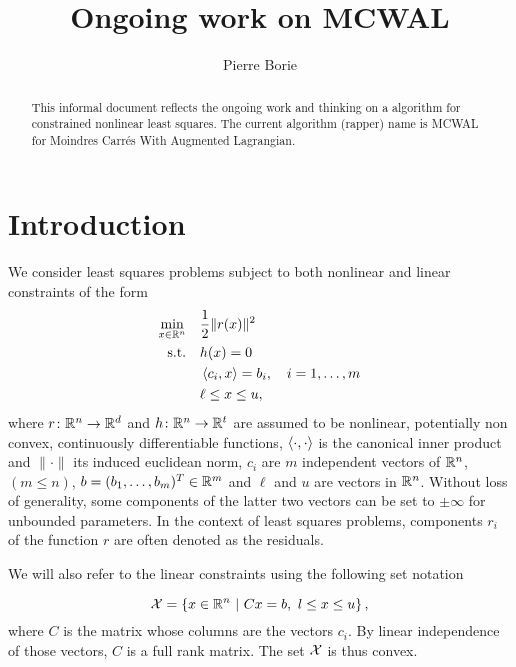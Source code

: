 \documentclass[10pt]{article}
\numberwithin{equation}{section}
\begin{document}
	
	
	\title{Ongoing work on MCWAL} %
	\author{Pierre Borie}
	
	
	
	\maketitle
	
	\begin{abstract}
		\noindent This informal document  reflects the ongoing work and thinking on a algorithm for constrained nonlinear least squares. The current algorithm (rapper) name is MCWAL for Moindres Carr\'es With Augmented Lagrangian.
	\end{abstract} %
	

	\section{Introduction}\label{sec:intro}
	
	We consider least squares problems subject to both nonlinear and linear constraints of the form
	\begin{equation}
		\label{eq:model_cnls}
		\begin{aligned}
			\min_{x\in {\mathbb{R}}^n} \quad & \dfrac{1}{2} \|r(x)\|^2 \\
			\text{s.t.} \quad & h(x) = 0 \\
			& \left\langle {c_i} , {x} \right\rangle = b_i,\quad i=1,\ldots,m \\
			& \ell \le x \le u,
		\end{aligned}
	\end{equation}
	where $r\colon {\mathbb{R}}^n \to {\mathbb{R}}^d$  and $h\colon {\mathbb{R}}^n \to {\mathbb{R}}^t$ are assumed to be nonlinear, potentially non convex, continuously differentiable functions, $\left\langle {\cdot} , {\cdot} \right\rangle$ is the canonical inner product and $\|\cdot\| $  its induced euclidean norm, $c_i$ are $m$  independent vectors of ${\mathbb{R}}^n$, $( m \le n)$, $b=(b_1,\ldots,b_m)^T \in {\mathbb{R}}^m$ and $\ell$ and $u$ are vectors in ${\mathbb{R}}^n$. Without loss of generality, some components of the latter two vectors can be set to $\pm \infty$ for unbounded parameters. In the context of least squares problems, components $r_i$ of the function $r$ are often denoted as the residuals.
	
	We will also refer to the linear constraints using the following set notation 
	
	\begin{equation}
		\label{eq:linear_constraints}
		{\mathcal{X}} = \left\{ x \in {\mathbb{R}}^n \ | \ Cx=b,\ l \le x \le u\right\},
	\end{equation}
	where $C$ is the matrix whose columns are the vectors $c_i$. By linear independence of those vectors, $C$ is a full rank matrix. The set ${\mathcal{X}}$ is thus convex.
	
\end{document}
